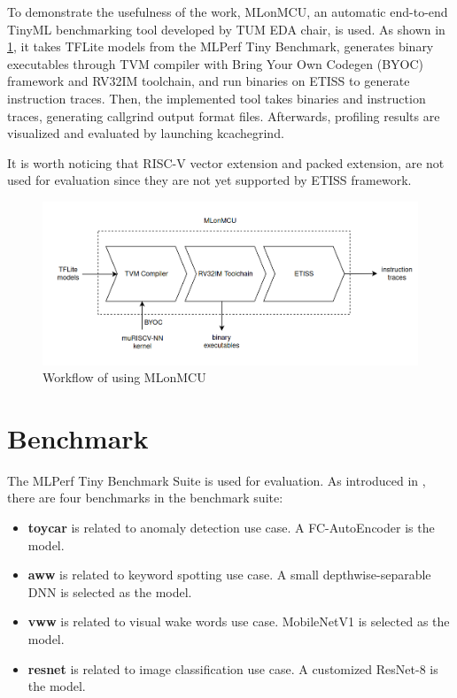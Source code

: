 To demonstrate the usefulness of the work, MLonMCU, an automatic end-to-end TinyML benchmarking tool developed by TUM EDA chair, is used. As shown in \cref{fig:evaluation_workflow}, it takes TFLite models from the MLPerf Tiny Benchmark, generates binary executables through TVM compiler with Bring Your Own Codegen (BYOC) framework and RV32IM toolchain, and run binaries on ETISS to generate instruction traces. Then, the implemented tool takes binaries and instruction traces, generating callgrind output format files. Afterwards, profiling results are visualized and evaluated by launching kcachegrind.

It is worth noticing that RISC-V vector extension and packed extension, are not used for evaluation since they are not yet supported by ETISS framework.

\begin{figure}[h]
    \centering
    \includegraphics[width=\linewidth]{figures/evaluation_workflow.png}
    \caption{Workflow of using MLonMCU}
    \label{fig:evaluation_workflow}
\end{figure}

\section{Benchmark}
The MLPerf Tiny Benchmark Suite is used for evaluation. As introduced in \cite{banbury2021mlperf}, there are four benchmarks in the benchmark suite:

\begin{itemize}
    \item \textbf{toycar} is related to anomaly detection use case. A FC-AutoEncoder is the model. 
    \item \textbf{aww} is related to keyword spotting use case. A small depthwise-separable DNN is selected as the model.
    \item \textbf{vww} is related to visual wake words use case. MobileNetV1 is selected as the model. 
    \item \textbf{resnet} is related to image classification use case. A customized ResNet-8 is the model.
\end{itemize}

